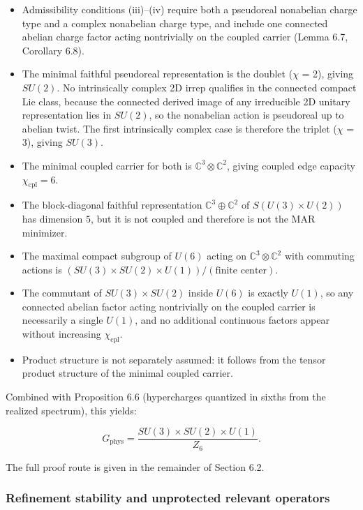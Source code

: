 \begin{itemize}
\tightlist
\item
  Admissibility conditions (iii)--(iv) require both a pseudoreal nonabelian charge type and a complex nonabelian charge type, and include one connected abelian charge factor acting nontrivially on the coupled carrier (Lemma 6.7, Corollary 6.8).
\item
  The minimal faithful pseudoreal representation is the doublet (\ensuremath{\chi} = 2), giving \(SU(2)\). No intrinsically complex 2D irrep qualifies in the connected compact Lie class, because the connected derived image of any irreducible 2D unitary representation lies in \(SU(2)\), so the nonabelian action is pseudoreal up to abelian twist. The first intrinsically complex case is therefore the triplet (\ensuremath{\chi} = 3), giving \(SU(3)\).
\item
  The minimal coupled carrier for both is \(\mathbb{C}^3 \otimes \mathbb{C}^2\), giving coupled edge capacity \(\chi_{\mathrm{cpl}} = 6\).
\item
  The block-diagonal faithful representation \(\mathbb{C}^3 \oplus \mathbb{C}^2\) of \(S(U(3)\times U(2))\) has dimension \(5\), but it is not coupled and therefore is not the MAR minimizer.
\item
  The maximal compact subgroup of \(U(6)\) acting on \(\mathbb{C}^3 \otimes \mathbb{C}^2\) with commuting actions is \((SU(3) \times SU(2) \times U(1))/(\text{finite center})\).
\item
  The commutant of \(SU(3) \times SU(2)\) inside \(U(6)\) is exactly \(U(1)\), so any connected abelian factor acting nontrivially on the coupled carrier is necessarily a single \(U(1)\), and no additional continuous factors appear without increasing \(\chi_{\mathrm{cpl}}\).
\item
  Product structure is not separately assumed: it follows from the tensor product structure of the minimal coupled carrier.
\end{itemize}

Combined with Proposition 6.6 (hypercharges quantized in sixths from the realized spectrum), this yields:

\[
G_{\mathrm{phys}} = \frac{SU(3) \times SU(2) \times U(1)}{Z_6}.
\]

The full proof route is given in the remainder of Section 6.2.

\subsubsection{Refinement stability and unprotected relevant operators}\label{63-refinement-stability-and-unprotected-relevant-operators}

